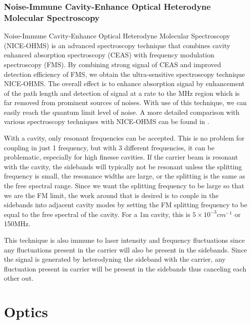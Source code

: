 \documentclass[a4paper]{book}
\begin{document}
\subsection{Noise-Immune Cavity-Enhance Optical Heterodyne Molecular Spectroscopy}
\label{ssec:NICE-OHMS}
Noise-Immune Cavity-Enhance Optical Heterodyne Molecular Spectroscopy (NICE-OHMS) is an advanced spectroscopy technique that combines cavity enhanced absorption spectroscopy (CEAS) with frequency modulation spectroscopy (FMS). By combining strong signal of CEAS and improved detection efficiency of FMS, we obtain the ultra-sensitive spectroscopy technique NICE-OHMS. The overall effect is to enhance absorption signal by enhancement of the path length and detection of signal at a rate to the MHz region which is far removed from prominent sources of noises. With use of this technique, we can easily reach the quantum limit level of noise.
A more detailed comparison with various spectroscopy techniques with NICE-OHMS can be found in \cite{NICE-OHMS}.

With a cavity, only resonant frequencies can be accepted. This is no problem for coupling in just 1 frequency, but with 3 different frequencies, it can be problematic, especially for high finesse cavities.  If the carrier beam is resonant with the cavity, the sidebands will typically not be resonant unless the splitting frequency is small, the resonance widths are large, or the splitting is the same as the free spectral range. Since we want the splitting frequency to be large so that we are the FM limit, the work around that is desired is to couple in the sidebands into adjacent cavity modes by setting the FM splitting frequency to be equal to the free spectral of the cavity. For a 1m cavity, this is $5\times 10^{-3} cm^{-1}$ or 150MHz.

This technique is also immune to laser intensity and frequency fluctuations since any fluctuations present in the carrier will also be present in the sidebands. Since the signal is generated by heterodyning the sideband with the carrier, any fluctuation present in carrier will be present in the sidebands thus canceling each other out.

\chapter{Optics}
\end{document}
